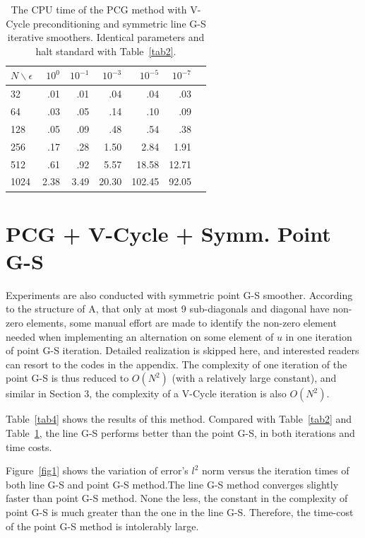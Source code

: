 \documentclass{article}
\begin{document}
\begin{table}[t]
\caption{The CPU time of the PCG method with V-Cycle preconditioning and symmetric line G-S iterative smoothers. Identical parameters and halt standard with Table~\ref{tab2}. }
\label{tab3}
\vskip 0.15in
\begin{center}
\begin{small}
\begin{sc}
\begin{tabular}{lrrrrrr}
\toprule
$N\backslash\epsilon$ & $10^0$ & $10^{-1}$ & $10^{-3}$ & $10^{-5}$ & $10^{-7}$ \\
\midrule
32 & .01 & .01 & .04 & .04 & .03 \\
64 & .03 & .05 & .14 & .10 & .09 \\
128 & .05 & .09 & .48 & .54 & .38 \\
256 & .17 & .28 & 1.50 & 2.84 & 1.91\\
512 & .61 & .92 & 5.57 & 18.58 & 12.71 \\
1024 & 2.38 & 3.49 & 20.30 & 102.45 & 92.05 \\
\bottomrule
\end{tabular}
\end{sc}
\end{small}
\end{center}
\vskip -0.1in
\end{table}

\section{PCG + V-Cycle + Symm. Point G-S}

Experiments are also conducted with symmetric point G-S smoother. According to the structure of A, that only at most 9 sub-diagonals and diagonal have non-zero elements, some manual effort are made to identify the non-zero element needed when implementing an alternation on some element of $u$ in one iteration of point G-S iteration. Detailed realization is skipped here, and interested readers can resort to the codes in the appendix. The complexity of one iteration of the point G-S is thus reduced to $O(N^2)$ (with a relatively large constant), and similar in Section 3, the complexity of a V-Cycle iteration is also $O(N^2)$.

Table~\ref{tab4} shows the results of this method. Compared with Table~\ref{tab2} and Table~\ref{tab3}, the line G-S performs better than the point G-S, in both iterations and time costs.

Figure~\ref{fig1} shows the variation of error's $l^2$ norm versus the iteration times of both line G-S and point G-S method.The line G-S method converges slightly faster than point G-S method. None the less, the constant in the complexity of point G-S is much greater than the one in the line G-S. Therefore, the time-cost of the point G-S method is intolerably large.
\end{document}
